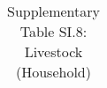 \begin{longtable}{llcccccccccc}
\caption{Supplementary Table SI.8: Livestock (Household)} \label{tab:pap__d5} \\                                                                                                                                                                                                                                                                                                                                                                                                                                                                                                                                                                                                                                                                                                                                                                                                          
\hline \hline                                                                                                                                                                                                                                                                                                                                                                                                                                                                                                                                                                                                                                                                                                                                                                                                                                                                             

\end{longtable}
